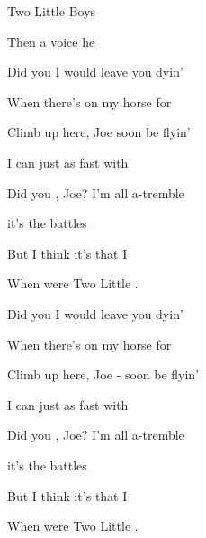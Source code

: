 \begin{SBSong}{Two Little Boys}
\begin{SBVerse}
    Then  a voice he 
  \end{SBVerse}
  \CBPageBrk
  \begin{SBVerse}
    Did you  I would leave you dyin'
    
    When there's  on my horse for 
    
    Climb up here, Joe  soon be flyin'
    
    I can  just as fast with 
    
    Did you , Joe? I'm all a-tremble
    
     it's the battles 
    
    But I think it's that I 
    
    When  were Two Little .
   \end{SBVerse}
   \begin{SBVerse}
    Did you  I would leave you dyin'
    
    When there's  on my horse for 
    
    Climb up here, Joe -  soon be flyin'
    
    I can  just as fast with 
    
    Did you , Joe? I'm all a-tremble
    
     it's the battles 
    
    But I think it's that I 
    
    When  were Two Little .
   \end{SBVerse}
\end{SBSong}
